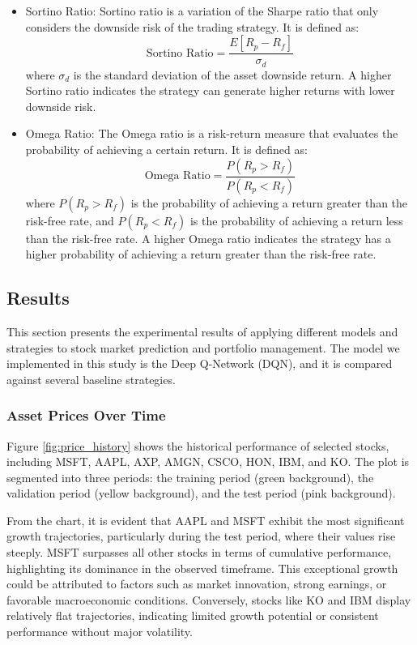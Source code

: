 \documentclass[conference]{IEEEtran}
\begin{document}
\begin{itemize}
  \item Sortino Ratio: Sortino ratio is a variation of the Sharpe ratio that only considers the downside risk of the trading strategy. It is defined as:
    \begin{equation}
      \text{Sortino Ratio} = \frac{E[R_p - R_f]}{\sigma_d}
    \end{equation}
    where $\sigma_d$ is the standard deviation of the asset downside return. A higher Sortino ratio indicates the strategy can generate higher returns with lower downside risk.
  \item Omega Ratio: The Omega ratio is a risk-return measure that evaluates the probability of achieving a certain return. It is defined as:
    \begin{equation}
      \text{Omega Ratio} = \frac{P(R_p > R_f)}{P(R_p < R_f)}
    \end{equation}
    where $P(R_p > R_f)$ is the probability of achieving a return greater than the risk-free rate, and $P(R_p < R_f)$ is the probability of achieving a return less than the risk-free rate. A higher Omega ratio indicates the strategy has a higher probability of achieving a return greater than the risk-free rate.
\end{itemize}

\subsection{Results}
This section presents the experimental results of applying different models and strategies to stock market prediction and portfolio management. The model we implemented in this study is the Deep Q-Network (DQN), and it is compared against several baseline strategies.

\subsubsection{Asset Prices Over Time}
Figure \ref{fig:price_history} shows the historical performance of selected stocks, including MSFT, AAPL, AXP, AMGN, CSCO, HON, IBM, and KO. The plot is segmented into three periods: the training period (green background), the validation period (yellow background), and the test period (pink background).

From the chart, it is evident that AAPL and MSFT exhibit the most significant growth trajectories, particularly during the test period, where their values rise steeply. MSFT surpasses all other stocks in terms of cumulative performance, highlighting its dominance in the observed timeframe. This exceptional growth could be attributed to factors such as market innovation, strong earnings, or favorable macroeconomic conditions. Conversely, stocks like KO and IBM display relatively flat trajectories, indicating limited growth potential or consistent performance without major volatility.
\end{document}
